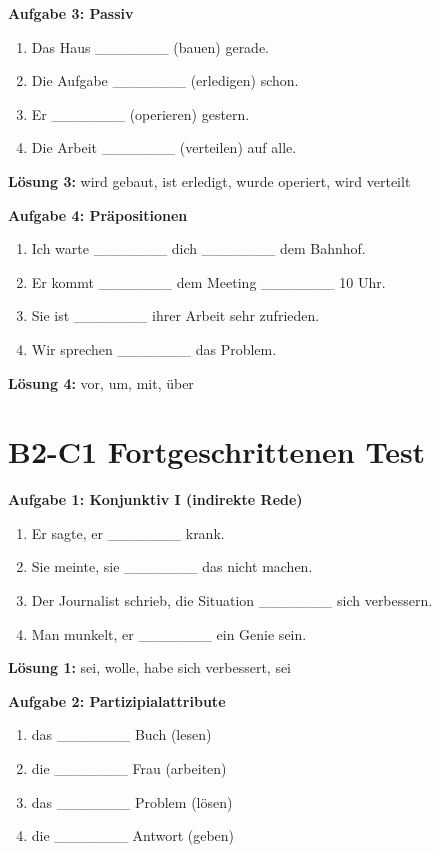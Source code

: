 \bigskip
\noindent\textbf{Aufgabe 3: Passiv}

\begin{enumerate}
    \item Das Haus \_\_\_\_\_\_\_ (bauen) gerade.
    \item Die Aufgabe \_\_\_\_\_\_\_ (erledigen) schon.
    \item Er \_\_\_\_\_\_\_ (operieren) gestern.
    \item Die Arbeit \_\_\_\_\_\_\_ (verteilen) auf alle.
\end{enumerate}

\bigskip
\textbf{Lösung 3:} wird gebaut, ist erledigt, wurde operiert, wird verteilt

\bigskip
\noindent\textbf{Aufgabe 4: Präpositionen}

\begin{enumerate}
    \item Ich warte \_\_\_\_\_\_\_ dich \_\_\_\_\_\_\_ dem Bahnhof.
    \item Er kommt \_\_\_\_\_\_\_ dem Meeting \_\_\_\_\_\_\_ 10 Uhr.
    \item Sie ist \_\_\_\_\_\_\_ ihrer Arbeit sehr zufrieden.
    \item Wir sprechen \_\_\_\_\_\_\_ das Problem.
\end{enumerate}

\bigskip
\textbf{Lösung 4:} vor, um, mit, über

\section{B2-C1 Fortgeschrittenen Test}

\bigskip
\noindent\textbf{Aufgabe 1: Konjunktiv I (indirekte Rede)}

\begin{enumerate}
    \item Er sagte, er \_\_\_\_\_\_\_ krank.
    \item Sie meinte, sie \_\_\_\_\_\_\_ das nicht machen.
    \item Der Journalist schrieb, die Situation \_\_\_\_\_\_\_ sich verbessern.
    \item Man munkelt, er \_\_\_\_\_\_\_ ein Genie sein.
\end{enumerate}

\bigskip
\textbf{Lösung 1:} sei, wolle, habe sich verbessert, sei

\bigskip
\noindent\textbf{Aufgabe 2: Partizipialattribute}

\begin{enumerate}
    \item das \_\_\_\_\_\_\_ Buch (lesen)
    \item die \_\_\_\_\_\_\_ Frau (arbeiten)
    \item das \_\_\_\_\_\_\_ Problem (lösen)
    \item die \_\_\_\_\_\_\_ Antwort (geben)
\end{enumerate}

